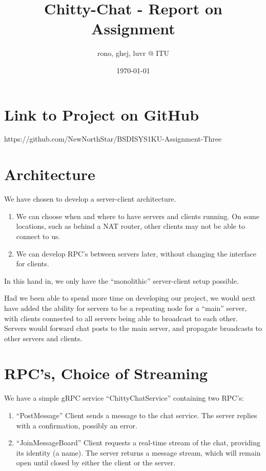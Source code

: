 \documentclass[a4paper,11pt]{article}
\title{Chitty-Chat - Report on Assignment}
\author{rono, ghej, luvr @ ITU}
\date{\today}
\begin{document}
\maketitle

\tableofcontents

\pagebreak

\section{Link to Project on GitHub}
https://github.com/NewNorthStar/BSDISYS1KU-Assignment-Three

\section{Architecture}

We have chosen to develop a server-client architecture. 

\begin{enumerate}
    \item We can choose when and where to have servers and clients running. On some locations, such as behind a NAT router, other clients may not be able to connect to us. 
    \item We can develop RPC's between servers later, without changing the interface for clients. 
\end{enumerate}

In this hand in, we only have the ``monolithic'' server-client setup possible. 

\bigbreak

Had we been able to spend more time on developing our project, we would next have added the ability for servers to be a repeating node for a ``main'' server, with clients connected to all servers being able to broadcast to each other. Servers would forward chat posts to the main server, and propagate broadcasts to other servers and clients. 

\section{RPC's, Choice of Streaming}
We have a simple gRPC service ``ChittyChatService'' containing two RPC's:

\begin{enumerate}
    \item ``PostMessage'' Client sends a message to the chat service. The server replies with a confirmation, possibly an error. 
    \item ``JoinMessageBoard'' Client requests a real-time stream of the chat, providing its identity (a name). The server returns a message stream, which will remain open until closed by either the client or the server. 
\end{enumerate}
\end{document}
